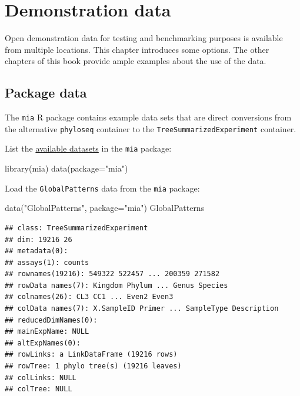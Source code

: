 \documentclass[
]{book}
\newenvironment{Shaded}{\begin{snugshade}}{\end{snugshade}}
\newcommand{\AttributeTok}[1]{\textcolor[rgb]{0.77,0.63,0.00}{#1}}
\newcommand{\FunctionTok}[1]{\textcolor[rgb]{0.00,0.00,0.00}{#1}}
\newcommand{\NormalTok}[1]{#1}
\newcommand{\StringTok}[1]{\textcolor[rgb]{0.31,0.60,0.02}{#1}}
\begin{document}
\hypertarget{example-data}{%
\section{Demonstration data}\label{example-data}}

Open demonstration data for testing and benchmarking purposes is
available from multiple locations. This chapter introduces some
options. The other chapters of this book provide ample examples about
the use of the data.

\hypertarget{package-data}{%
\subsection{Package data}\label{package-data}}

The \texttt{mia} R package contains example data sets that are direct
conversions from the alternative \texttt{phyloseq} container to the
\texttt{TreeSummarizedExperiment} container.

List the \href{https://microbiome.github.io/mia/reference/index.html}{available
datasets} in
the \texttt{mia} package:

\begin{Shaded}
\begin{Highlighting}[]
\FunctionTok{library}\NormalTok{(mia)}
\FunctionTok{data}\NormalTok{(}\AttributeTok{package=}\StringTok{"mia"}\NormalTok{)}
\end{Highlighting}
\end{Shaded}

Load the \texttt{GlobalPatterns} data from the \texttt{mia} package:

\begin{Shaded}
\begin{Highlighting}[]
\FunctionTok{data}\NormalTok{(}\StringTok{"GlobalPatterns"}\NormalTok{, }\AttributeTok{package=}\StringTok{"mia"}\NormalTok{)}
\NormalTok{GlobalPatterns}
\end{Highlighting}
\end{Shaded}

\begin{verbatim}
## class: TreeSummarizedExperiment 
## dim: 19216 26 
## metadata(0):
## assays(1): counts
## rownames(19216): 549322 522457 ... 200359 271582
## rowData names(7): Kingdom Phylum ... Genus Species
## colnames(26): CL3 CC1 ... Even2 Even3
## colData names(7): X.SampleID Primer ... SampleType Description
## reducedDimNames(0):
## mainExpName: NULL
## altExpNames(0):
## rowLinks: a LinkDataFrame (19216 rows)
## rowTree: 1 phylo tree(s) (19216 leaves)
## colLinks: NULL
## colTree: NULL
\end{verbatim}
\end{document}
